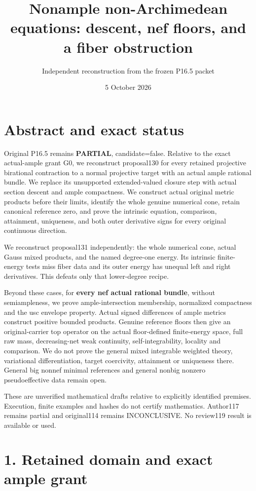 \documentclass[
  10pt,
]{article}
\title{Nonample non-Archimedean equations: descent, nef floors, and a
fiber obstruction}
\author{Independent reconstruction from the frozen P16.5 packet}
\date{5 October 2026}
\begin{document}
\maketitle

\section{Abstract and exact status}\label{abstract-and-exact-status}

Original P16.5 remains \textbf{PARTIAL}, candidate=false. Relative to
the exact actual-ample grant G0, we reconstruct proposal130 for every
retained projective birational contraction to a normal projective target
with an actual ample rational bundle. We replace its unsupported
extended-valued closure step with actual section descent and ample
compactness. We construct actual original metric products before their
limits, identify the whole genuine numerical cone, retain canonical
reference zero, and prove the intrinsic equation, comparison,
attainment, uniqueness, and both outer derivative signs for every
original continuous direction.

We reconstruct proposal131 independently: the whole numerical cone,
actual Gauss mixed products, and the named degree-one energy. Its
intrinsic finite-energy tests miss fiber data and its outer energy has
unequal left and right derivatives. This defeats only that lower-degree
recipe.

Beyond these cases, for \textbf{every nef actual rational bundle},
without semiampleness, we prove ample-intersection membership,
normalized compactness and the usc envelope property. Actual signed
differences of ample metrics construct positive bounded products.
Genuine reference floors then give an original-carrier top operator on
the actual floor-defined finite-energy space, full raw mass,
decreasing-net weak continuity, self-integrability, locality and
comparison. We do not prove the general mixed integrable weighted
theory, variational differentiation, target coercivity, attainment or
uniqueness there. General big nonnef minimal references and general
nonbig nonzero pseudoeffective data remain open.

These are unverified mathematical drafts relative to explicitly
identified premises. Execution, finite examples and hashes do not
certify mathematics. Author117 remains partial and original114 remains
INCONCLUSIVE. No review119 result is available or used.

\section{1. Retained domain and exact ample
grant}\label{retained-domain-and-exact-ample-grant}
\end{document}
